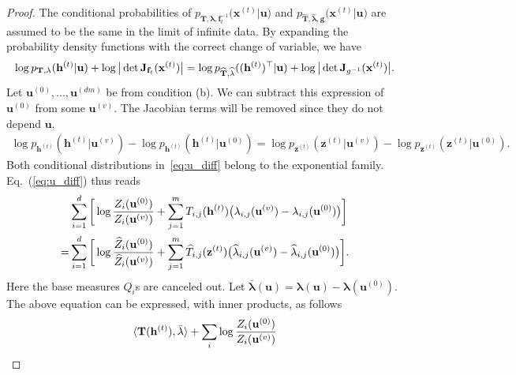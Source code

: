 \documentclass[twoside]{article}
\begin{document}
\begin{proof}
The conditional probabilities of $p_{\mathbf{T}, \mathbf{\lambda}, \mathbf{f}_t^{-1} }\big(\mathbf{x}^{(t)} | \mathbf{u}\big)$ and $p_{\widehat{\mathbf{T}}, \widehat{\mathbf{\lambda}}, \mathbf{g} }\big(\mathbf{x}^{(t)} | \mathbf{u}\big)$ are assumed to be the same in the limit of infinite data.  
By expanding the probability density functions with the correct change of variable, we have 
\begin{align} \notag
\log p_{\mathbf{T}, \mathbf{\lambda}}(\mathbf{h}^{(t)}| \mathbf{u}) + \log \big| \det \mathbf{J}_{\mathbf{f}_t}(\mathbf{x}^{(t)}) \big| = \log p_{\widehat{\mathbf{T}}, \widehat{\mathbf{\lambda}}}((\mathbf{h}^{(t)})^\top| \mathbf{u}) + \log \big| \det \mathbf{J}_{g^{-1}}(\mathbf{x}^{(t)}) \big|.
\end{align}
Let $\mathbf{u}^{(0)},...,\mathbf{u}^{(dm)}$ be from condition (b). We can subtract this expression of $\mathbf{u}^{(0)}$ from some  $\mathbf{u}^{(v)}$. The Jacobian terms will be removed since they do not depend  $\mathbf{u}$,
\begin{align} \label{eq:u_diff}
\log p_{\mathbf{h}^{(t)}}(\mathbf{h}^{(t)}|\mathbf{u}^{(v)}) - \log p_{\mathbf{h}^{(t)}}(\mathbf{h}^{(t)}|\mathbf{u}^{(0)}) =\log p_{\mathbf{z}^{(t)}}(\mathbf{z}^{(t)}|\mathbf{u}^{(v)}) - \log p_{\mathbf{z}^{(t)}}(\mathbf{z}^{(t)}|\mathbf{u}^{(0)}) .
\end{align}
Both conditional distributions in~\eqref{eq:u_diff} belong to the exponential family. 
Eq.~(\ref{eq:u_diff}) thus reads
\begin{align} \notag
&\sum_{i=1}^d \bigg[\log \frac{Z_i(\mathbf{u}^{(0)})}{Z_i(\mathbf{u}^{(v)})} + \sum_{j=1}^m T_{i,j}(\mathbf{h}^{(t)})\big(\lambda_{i,j}(\mathbf{u}^{(v)})- \lambda_{i,j}(\mathbf{u}^{(0)})\big) \bigg] \\ \notag
= & \sum_{i=1}^d \bigg[\log \frac{\widehat{Z}_i(\mathbf{u}^{(0)})}{\widehat{Z}_i(\mathbf{u}^{(v)})} + \sum_{j=1}^m \widehat{T}_{i,j}(\mathbf{z}^{(t)})\big(\widehat{\lambda}_{i,j}(\mathbf{u}^{(v)})- \widehat{\lambda}_{i,j}(\mathbf{u}^{(0)})\big) \bigg].
\end{align}
Here the base measures $Q_i$s are canceled out. 
Let $\bar{\mathbf{\lambda}}(\mathbf{u}) = \mathbf{\lambda}(\mathbf{u})-\mathbf{\lambda}(\mathbf{u}^{(0)})$. 
The above equation can be expressed, with inner products, as follows
\begin{align} \notag
\langle \mathbf{T}(\mathbf{h}^{(t)}), \bar{\mathbf{\lambda}}	\rangle + \sum_i \log \frac{Z_i(\mathbf{u}^{(0)})}{Z_i(\mathbf{u}^{(v)})}

\end{align}
\end{proof}
\end{document}
